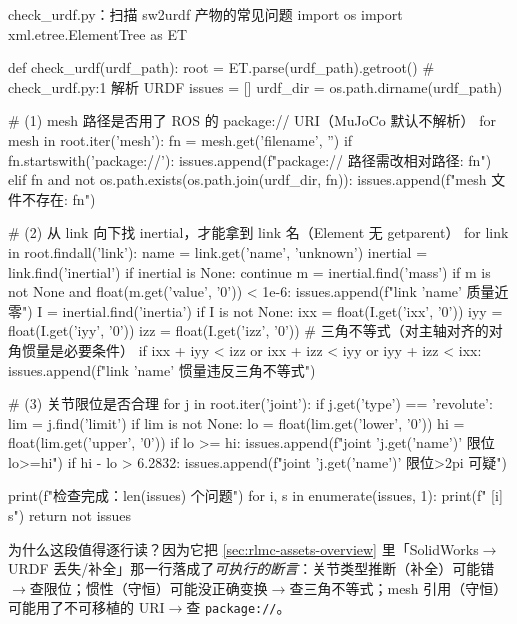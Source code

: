 \begin{codebox}[Python]{check\_urdf.py：扫描 sw2urdf 产物的常见问题}
import os
import xml.etree.ElementTree as ET

def check_urdf(urdf_path):
    root = ET.parse(urdf_path).getroot()       # check_urdf.py:1 解析 URDF
    issues = []
    urdf_dir = os.path.dirname(urdf_path)

    # (1) mesh 路径是否用了 ROS 的 package:// URI（MuJoCo 默认不解析）
    for mesh in root.iter('mesh'):
        fn = mesh.get('filename', '')
        if fn.startswith('package://'):
            issues.append(f"package:// 路径需改相对路径: {fn}")
        elif fn and not os.path.exists(os.path.join(urdf_dir, fn)):
            issues.append(f"mesh 文件不存在: {fn}")

    # (2) 从 link 向下找 inertial，才能拿到 link 名（Element 无 getparent）
    for link in root.findall('link'):
        name = link.get('name', 'unknown')
        inertial = link.find('inertial')
        if inertial is None:
            continue
        m = inertial.find('mass')
        if m is not None and float(m.get('value', '0')) < 1e-6:
            issues.append(f"link '{name}' 质量近零")
        I = inertial.find('inertia')
        if I is not None:
            ixx = float(I.get('ixx', '0'))
            iyy = float(I.get('iyy', '0'))
            izz = float(I.get('izz', '0'))
            # 三角不等式（对主轴对齐的对角惯量是必要条件）
            if ixx + iyy < izz or ixx + izz < iyy or iyy + izz < ixx:
                issues.append(f"link '{name}' 惯量违反三角不等式")

    # (3) 关节限位是否合理
    for j in root.iter('joint'):
        if j.get('type') == 'revolute':
            lim = j.find('limit')
            if lim is not None:
                lo = float(lim.get('lower', '0'))
                hi = float(lim.get('upper', '0'))
                if lo >= hi:
                    issues.append(f"joint '{j.get('name')}' 限位 lo>=hi")
                if hi - lo > 6.2832:
                    issues.append(f"joint '{j.get('name')}' 限位>2pi 可疑")

    print(f"检查完成：{len(issues)} 个问题")
    for i, s in enumerate(issues, 1):
        print(f"  [{i}] {s}")
    return not issues
\end{codebox}

为什么这段值得逐行读？因为它把 \cref{sec:rlmc-assets-overview} 里「SolidWorks$\to$URDF 丢失/补全」那一行落成了\emph{可执行的断言}：关节类型推断（补全）可能错$\to$查限位；惯性（守恒）可能没正确变换$\to$查三角不等式；mesh 引用（守恒）可能用了不可移植的 URI$\to$查 \texttt{package://}。

